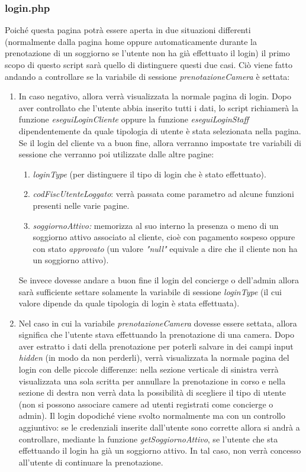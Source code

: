\documentclass [a4paper, 12pt]{book}
\begin{document}
\subsubsection{login.php}
Poiché questa pagina potrà essere aperta in due situazioni differenti (normalmente dalla pagina home oppure automaticamente durante la prenotazione di un soggiorno se l'utente non ha già effettuato il login) il primo scopo di questo script sarà quello di distinguere questi due casi. Ciò viene fatto andando a controllare se la variabile di sessione \textit{prenotazioneCamera} è settata:
\begin{enumerate}
\item In caso negativo, allora verrà visualizzata la normale pagina di login. Dopo aver controllato che l'utente abbia inserito tutti i dati, lo script richiamerà la funzione \textit{eseguiLoginCliente} oppure la funzione \textit{eseguiLoginStaff} dipendentemente da quale tipologia di utente è stata selezionata nella pagina. Se il login del cliente va a buon fine, allora verranno impostate tre variabili di sessione che verranno poi utilizzate dalle altre pagine:
\begin{enumerate}
\item \textit{loginType} (per distinguere il tipo di login che è stato effettuato).
\item \textit{codFiscUtenteLoggato}: verrà passata come parametro ad alcune funzioni presenti nelle varie pagine.
\item \textit{soggiornoAttivo:} memorizza al suo interno la presenza o meno di un soggiorno attivo associato al cliente, cioè con pagamento sospeso oppure con stato \textit{approvato} (un valore \textit{"null"} equivale a dire che il cliente non ha un soggiorno attivo).
\end{enumerate}  
Se invece dovesse andare a buon fine il login del concierge o dell'admin allora sarà sufficiente settare solamente la variabile di sessione \textit{loginType} (il cui valore dipende da quale tipologia di login è stata effettuata).
\item Nel caso in cui la variabile \textit{prenotazioneCamera} dovesse essere settata, allora significa che l'utente stava effettuando la prenotazione di una camera. Dopo aver estratto i dati della prenotazione per poterli salvare in dei campi input \textit{hidden} (in modo da non perderli), verrà visualizzata la normale pagina del login con delle piccole differenze: nella sezione verticale di sinistra verrà visualizzata una sola scritta per annullare la prenotazione in corso e nella sezione di destra non verrà data la possibilità di scegliere il tipo di utente (non si possono associare camere ad utenti registrati come concierge o admin). Il login dopodiché viene svolto normalmente ma con un controllo aggiuntivo: se le credenziali inserite dall'utente sono corrette allora si andrà a controllare, mediante la funzione \textit{getSoggiornoAttivo}, se l'utente che sta effettuando il login ha già un soggiorno attivo. In tal caso, non verrà concesso all'utente di continuare la prenotazione.
\end{enumerate} 
\end{document}
